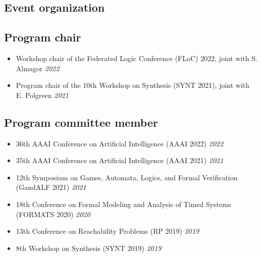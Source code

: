 \documentclass[10pt,a4paper]{moderncv}
\begin{document}
\subsection{Event organization}

\subsection{Program chair}
\begin{itemize}
  \item Workshop chair of the Federated Logic Conference (FLoC) 2022, joint
    with S. Almagor \hfill \textit{2022}
  \item Program chair of the 10th Workshop on Synthesis (SYNT 2021), joint
    with E. Polgreen \hfill \textit{2021}
\end{itemize}

\subsection{Program committee member}
\begin{itemize}
  \item 36th AAAI Conference on Artificial Intelligence (AAAI 2022) \hfill
    \textit{2022}
  \item 35th AAAI Conference on Artificial Intelligence (AAAI 2021) \hfill
    \textit{2021}
  \item 12th Symposium on Games, Automata, Logics, and Formal
    Verification (GandALF 2021) \hfill \textit{2021}
  \item 18th Conference on Formal Modeling and Analysis of Timed
    Systems (FORMATS 2020) \hfill \textit{2020}
  \item 13th Conference on Reachability Problems (RP 2019) \hfill \textit{2019}
  \item 8th Workshop on Synthesis (SYNT 2019) \hfill \textit{2019}
\end{itemize}
\end{document}
